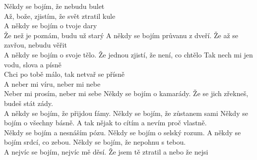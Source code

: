 \ve{}
Někdy se bojím, že nebudu bulet\\
Až, bože, zjistím, že svět ztratil kule\\
A někdy se bojím o tvoje dary\\
Že než je poznám, budu už starý
\ve{}
A někdy se bojím průvanu z dveří.
Že až se zavřou, nebudu věřit\\
A někdy se bojím o svoje tělo.
Že jednou zjistí, že není, co chtělo
\cho{}
Tak nech mi jen vodu, slova a písně\\
Chci po tobě málo, tak netvař se přísně\\
A neber mi víru, neber mi nebe\\
Neber mi prosím, neber mi sebe
\ve{}
Někdy se bojím o kamarády.
Že se jich zřekneš, budeš stát zády.\\
A někdy se bojím, že přijdou fámy.
Někdy se bojím, že zůstanem sami
\cho{}
\ve{}
Někdy se bojím o všechny básně.
A tak nějak to cítím a nevím proč vlastně.\\
Někdy se bojím a nesnáším pózu.
Někdy se bojím o selský rozum.
\ve{}
A někdy se bojím srdcí, co zebou.
Někdy se bojím, že nepohnu s tebou.\\
A nejvíc se bojím, nejvíc mě děsí.
Že jsem tě ztratil a nebo že nejsi
\cho{}
\esong{}